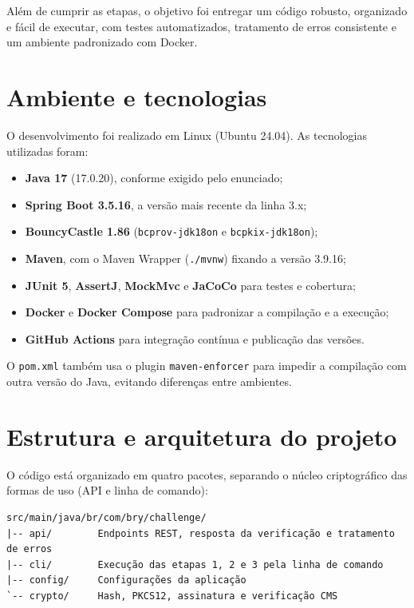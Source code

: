 \documentclass[12pt,a4paper]{article}
\begin{document}
Além de cumprir as etapas, o objetivo foi entregar um código robusto, organizado e fácil de executar, com testes automatizados, tratamento de erros consistente e um ambiente padronizado com Docker.

\section{Ambiente e tecnologias}

O desenvolvimento foi realizado em Linux (Ubuntu 24.04). As tecnologias utilizadas foram:

\begin{itemize}
    \item \textbf{Java 17} (17.0.20), conforme exigido pelo enunciado;
    \item \textbf{Spring Boot 3.5.16}, a versão mais recente da linha 3.x;
    \item \textbf{BouncyCastle 1.86} (\texttt{bcprov-jdk18on} e \texttt{bcpkix-jdk18on});
    \item \textbf{Maven}, com o Maven Wrapper (\texttt{./mvnw}) fixando a versão 3.9.16;
    \item \textbf{JUnit 5}, \textbf{AssertJ}, \textbf{MockMvc} e \textbf{JaCoCo} para testes e cobertura;
    \item \textbf{Docker} e \textbf{Docker Compose} para padronizar a compilação e a execução;
    \item \textbf{GitHub Actions} para integração contínua e publicação das versões.
\end{itemize}

O \texttt{pom.xml} também usa o plugin \texttt{maven-enforcer} para impedir a compilação com outra versão do Java, evitando diferenças entre ambientes.

\section{Estrutura e arquitetura do projeto}

O código está organizado em quatro pacotes, separando o núcleo criptográfico das formas de uso (API e linha de comando):

\begin{lstlisting}
src/main/java/br/com/bry/challenge/
|-- api/        Endpoints REST, resposta da verificação e tratamento de erros
|-- cli/        Execução das etapas 1, 2 e 3 pela linha de comando
|-- config/     Configurações da aplicação
`-- crypto/     Hash, PKCS12, assinatura e verificação CMS
\end{lstlisting}
\end{document}
